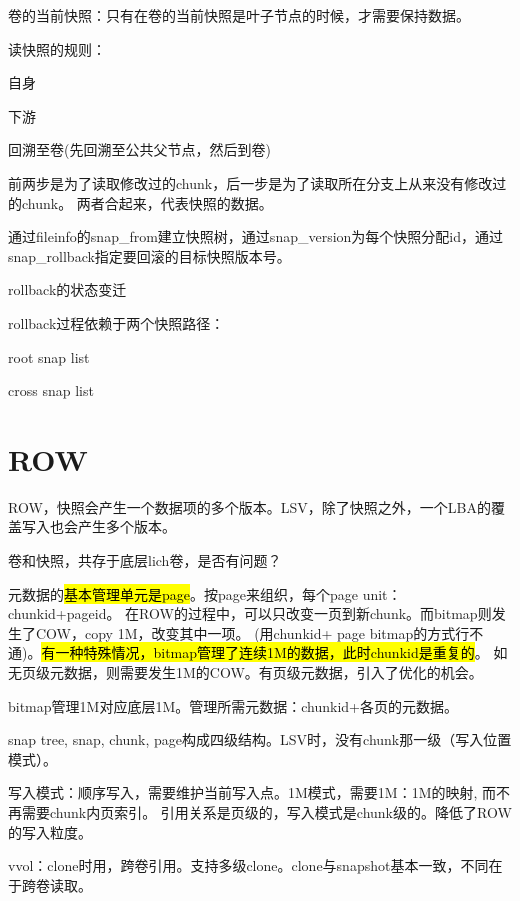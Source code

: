 卷的当前快照：只有在卷的当前快照是叶子节点的时候，才需要保持数据。

读快照的规则：
\begin{compactenum}
\item 自身
\item 下游
\item 回溯至卷(先回溯至公共父节点，然后到卷)
\end{compactenum}

前两步是为了读取修改过的chunk，后一步是为了读取所在分支上从来没有修改过的chunk。
两者合起来，代表快照的数据。

通过fileinfo的snap\_from建立快照树，通过snap\_version为每个快照分配id，通过snap\_rollback指定要回滚的目标快照版本号。

rollback的状态变迁

rollback过程依赖于两个快照路径：
\begin{compactenum}
\item root snap list
\item cross snap list
\end{compactenum}


\section{ROW}


ROW，快照会产生一个数据项的多个版本。LSV，除了快照之外，一个LBA的覆盖写入也会产生多个版本。

卷和快照，共存于底层lich卷，是否有问题？

元数据的\hl{基本管理单元是page}。按page来组织，每个page unit：chunkid+pageid。
在ROW的过程中，可以只改变一页到新chunk。而bitmap则发生了COW，copy 1M，改变其中一项。
(用chunkid+ page bitmap的方式行不通)。\hl{有一种特殊情况，bitmap管理了连续1M的数据，此时chunkid是重复的}。
如无页级元数据，则需要发生1M的COW。有页级元数据，引入了优化的机会。

bitmap管理1M对应底层1M。管理所需元数据：chunkid+各页的元数据。

snap tree, snap, chunk, page构成四级结构。LSV时，没有chunk那一级（写入位置模式）。

写入模式：顺序写入，需要维护当前写入点。1M模式，需要1M：1M的映射, 而不再需要chunk内页索引。
引用关系是页级的，写入模式是chunk级的。降低了ROW的写入粒度。

vvol：clone时用，跨卷引用。支持多级clone。clone与snapshot基本一致，不同在于跨卷读取。

